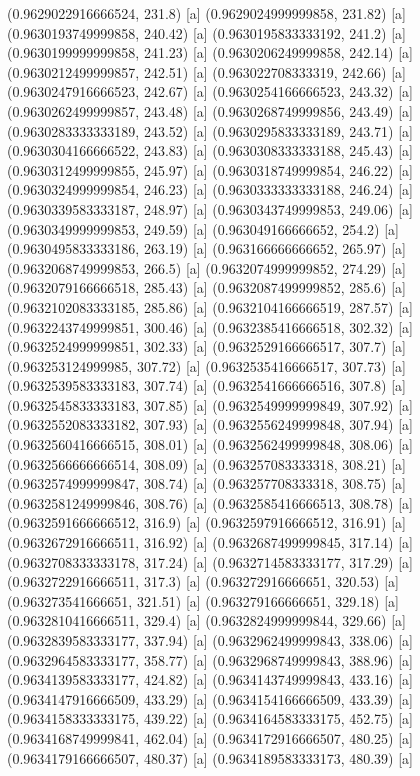 {{{(0.9629022916666524, 231.8) [a] 
(0.9629024999999858, 231.82) [a] 
(0.9630193749999858, 240.42) [a] 
(0.9630195833333192, 241.2) [a] 
(0.9630199999999858, 241.23) [a] 
(0.9630206249999858, 242.14) [a] 
(0.9630212499999857, 242.51) [a] 
(0.963022708333319, 242.66) [a] 
(0.9630247916666523, 242.67) [a] 
(0.9630254166666523, 243.32) [a] 
(0.9630262499999857, 243.48) [a] 
(0.9630268749999856, 243.49) [a] 
(0.9630283333333189, 243.52) [a] 
(0.9630295833333189, 243.71) [a] 
(0.9630304166666522, 243.83) [a] 
(0.9630308333333188, 245.43) [a] 
(0.9630312499999855, 245.97) [a] 
(0.9630318749999854, 246.22) [a] 
(0.9630324999999854, 246.23) [a] 
(0.9630333333333188, 246.24) [a] 
(0.9630339583333187, 248.97) [a] 
(0.9630343749999853, 249.06) [a] 
(0.9630349999999853, 249.59) [a] 
(0.963049166666652, 254.2) [a] 
(0.9630495833333186, 263.19) [a] 
(0.963166666666652, 265.97) [a] 
(0.9632068749999853, 266.5) [a] 
(0.9632074999999852, 274.29) [a] 
(0.9632079166666518, 285.43) [a] 
(0.9632087499999852, 285.6) [a] 
(0.9632102083333185, 285.86) [a] 
(0.9632104166666519, 287.57) [a] 
(0.9632243749999851, 300.46) [a] 
(0.9632385416666518, 302.32) [a] 
(0.9632524999999851, 302.33) [a] 
(0.9632529166666517, 307.7) [a] 
(0.963253124999985, 307.72) [a] 
(0.9632535416666517, 307.73) [a] 
(0.9632539583333183, 307.74) [a] 
(0.9632541666666516, 307.8) [a] 
(0.9632545833333183, 307.85) [a] 
(0.9632549999999849, 307.92) [a] 
(0.9632552083333182, 307.93) [a] 
(0.9632556249999848, 307.94) [a] 
(0.9632560416666515, 308.01) [a] 
(0.9632562499999848, 308.06) [a] 
(0.9632566666666514, 308.09) [a] 
(0.963257083333318, 308.21) [a] 
(0.9632574999999847, 308.74) [a] 
(0.963257708333318, 308.75) [a] 
(0.9632581249999846, 308.76) [a] 
(0.9632585416666513, 308.78) [a] 
(0.9632591666666512, 316.9) [a] 
(0.9632597916666512, 316.91) [a] 
(0.9632672916666511, 316.92) [a] 
(0.9632687499999845, 317.14) [a] 
(0.9632708333333178, 317.24) [a] 
(0.9632714583333177, 317.29) [a] 
(0.9632722916666511, 317.3) [a] 
(0.963272916666651, 320.53) [a] 
(0.963273541666651, 321.51) [a] 
(0.963279166666651, 329.18) [a] 
(0.9632810416666511, 329.4) [a] 
(0.9632824999999844, 329.66) [a] 
(0.9632839583333177, 337.94) [a] 
(0.9632962499999843, 338.06) [a] 
(0.9632964583333177, 358.77) [a] 
(0.9632968749999843, 388.96) [a] 
(0.9634139583333177, 424.82) [a] 
(0.9634143749999843, 433.16) [a] 
(0.9634147916666509, 433.29) [a] 
(0.9634154166666509, 433.39) [a] 
(0.9634158333333175, 439.22) [a] 
(0.9634164583333175, 452.75) [a] 
(0.9634168749999841, 462.04) [a] 
(0.9634172916666507, 480.25) [a] 
(0.9634179166666507, 480.37) [a] 
(0.9634189583333173, 480.39) [a] 
}}}
